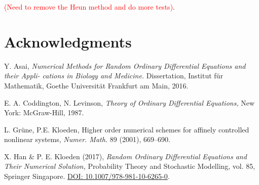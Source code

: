 \documentclass[reqno,12pt]{amsart}
\theoremstyle{plain}%
\theoremstyle{definition}
\begin{document}
\textcolor{red}{(Need to remove the Heun method and do more tests)}.

\section*{Acknowledgments}


\begin{thebibliography}{25}
     Y. Asai, \emph{Numerical Methods for Random Ordinary Differential Equations and their Appli-
    cations in Biology and Medicine.} Dissertation, Institut für Mathematik, Goethe Universität Frankfurt am Main, 2016.

     E. A. Coddington, N. Levinson, \emph{Theory of Ordinary Differential Equations,} New York: McGraw-Hill, 1987.

     L. Gr\"une, P.E. Kloeden, Higher order numerical schemes for affinely controlled nonlinear systems, \emph{Numer. Math.} 89 (2001), 669--690.

     X. Han \& P. E. Kloeden (2017), \emph{Random Ordinary Differential Equations and Their Numerical Solution,} Probability Theory and Stochastic Modelling, vol. 85, Springer Singapore. \href{https://link.springer.com/book/10.1007/978-981-10-6265-0}{DOI: 10.1007/978-981-10-6265-0}.
\end{thebibliography}
\end{document}
